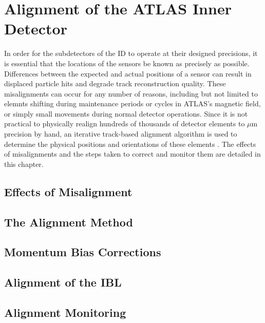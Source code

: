 \chapter[Alignment of the ATLAS Inner Detector][Alignment of the ATLAS Inner Detector]{Alignment of the ATLAS Inner Detector}
\label{ch:alignment}

In order for the subdetectors of the ID to operate at their designed precisions, it is essential that the locations of the sensors be known as precisely as possible.
Differences between the expected and actual positions of a sensor can result in displaced particle hits and degrade track reconstruction quality.
These misalignments can occur for any number of reasons, including but not limited to elemnts shifting during maintenance periods or cycles in ATLAS's magnetic field, or simply small movements during normal detector operations.
Since it is not practical to physically realign hundreds of thousands of detector elements to $\mu$m precision by hand, an iterative track-based alignment algorithm is used to determine the physical positions and orientations of these elements \cite{2011.alignment-7tev}. 
The effects of misalignments and the steps taken to correct and monitor them are detailed in this chapter.

\section{Effects of Misalignment}\label{align:effects}


\section{The Alignment Method}\label{align:method}


\section{Momentum Bias Corrections}\label{align:bias}


\section{Alignment of the IBL}\label{align:ibl} %


\section{Alignment Monitoring}\label{align:monitoring}

